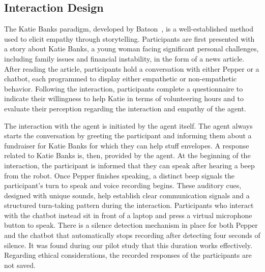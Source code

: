 \documentclass[runningheads]{llncs}
\begin{document}
\vspace{-2em}

\subsection{Interaction Design}
The Katie Banks paradigm, developed by Batson~\cite{coke}, is a well-established method used to elicit empathy through storytelling. Participants are first presented with a story about Katie Banks, a young woman facing significant personal challenges, including family issues and financial instability, in the form of a news article. After reading the article, participants hold a conversation with either Pepper or a chatbot, each programmed to display either empathetic or non-empathetic behavior. Following the interaction, participants complete a questionnaire to indicate their willingness to help Katie in terms of volunteering hours and to evaluate their perception regarding the interaction and empathy of the agent.

The interaction with the agent is initiated by the agent itself. The agent always starts the conversation by greeting the participant and informing them about a fundraiser for Katie Banks for which they can help stuff envelopes. A response related to Katie Banks is, then, provided by the agent. At the beginning of the interaction, the participant is informed that they can speak after hearing a beep from the robot. Once Pepper finishes speaking, a distinct beep signals the participant's turn to speak and voice recording begins. These auditory cues, designed with unique sounds, help establish clear communication signals and a structured turn-taking pattern during the interaction. Participants who interact with the chatbot instead sit in front of a laptop and press a virtual microphone button to speak. There is a silence detection mechanism in place for both Pepper and the chatbot that automatically stops recording after detecting four seconds of silence. It was found during our pilot study that this duration works effectively. Regarding ethical considerations, the recorded responses of the participants are not saved.
\end{document}

